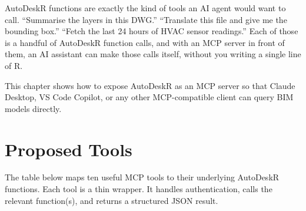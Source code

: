 \documentclass[
  11pt,
  letterpaper,
  DIV=11,
  numbers=noendperiod]{scrreprt}
\begin{document}
AutoDeskR functions are exactly the kind of tools an AI agent would want
to call. ``Summarise the layers in this DWG.'' ``Translate this file and
give me the bounding box.'' ``Fetch the last 24 hours of HVAC sensor
readings.'' Each of those is a handful of AutoDeskR function calls, and
with an MCP server in front of them, an AI assistant can make those
calls itself, without you writing a single line of R.

This chapter shows how to expose AutoDeskR as an MCP server so that
Claude Desktop, VS Code Copilot, or any other MCP-compatible client can
query BIM models directly.

\section{Proposed Tools}\label{proposed-tools}

The table below maps ten useful MCP tools to their underlying AutoDeskR
functions. Each tool is a thin wrapper. It handles authentication, calls
the relevant function(s), and returns a structured JSON result.
\end{document}
